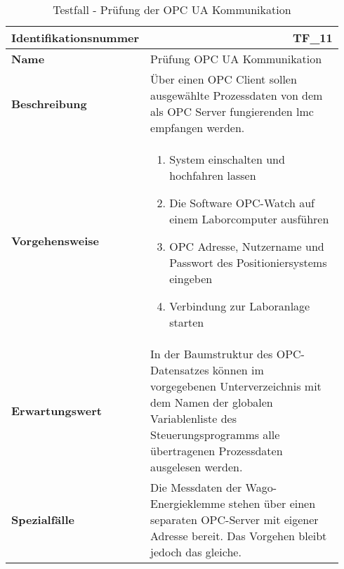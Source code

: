 \documentclass[../../../Bachelorarbeit.tex]{subfiles}
\begin{document}
\begin{table}[H]
    \centering
    \begin{tabular}{ p{0.34\linewidth}  p{0.6\linewidth} }
        \hline
        \textbf{Identifikationsnummer}  & \multicolumn{1}{r}{TF\_11} \\ \hline
        \textbf{Name}                   & Prüfung OPC UA Kommunikation \\
        \textbf{Beschreibung}           & Über einen OPC Client sollen ausgewählte Prozessdaten von dem als OPC Server fungierenden \acs{lmc} empfangen werden. \\
        \textbf{Vorgehensweise}         &   {\begin{enumerate}[noitemsep,topsep=0pt,parsep=0pt,partopsep=0pt,leftmargin=*]
                                                \item System einschalten und hochfahren lassen
                                                \item Die Software OPC-Watch auf einem Laborcomputer ausführen
                                                \item OPC Adresse, Nutzername und Passwort des Positioniersystems eingeben
                                                \item Verbindung zur Laboranlage starten
                                            \end{enumerate}} \\
        \textbf{Erwartungswert}         & In der Baumstruktur des OPC-Datensatzes können im vorgegebenen Unterverzeichnis mit dem Namen der globalen Variablenliste des Steuerungsprogramms alle übertragenen Prozessdaten ausgelesen werden. \\
        \textbf{Spezialfälle}           & Die Messdaten der Wago-Energieklemme stehen über einen separaten OPC-Server mit eigener Adresse bereit. Das Vorgehen bleibt jedoch das gleiche. \\ \hline
    \end{tabular}
    \caption[\acs{tf} - OPC UA Kommunikation]{Testfall - Prüfung der OPC UA Kommunikation}
    \label{tab:my-table80}
\end{table}
\end{document}
